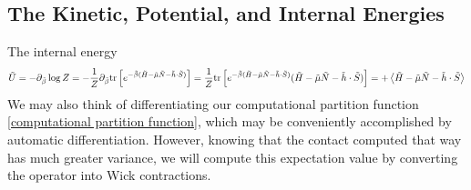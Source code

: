 \subsection{The Kinetic, Potential, and Internal Energies}\label{sec:energy}

The internal energy
\begin{align}
	\tilde{U}
	= - \partial_{\tilde{\beta}} \log Z
	=
	- \frac{1}{Z} \partial_{\tilde{\beta}} \text{tr}\left[ e^{-\tilde{\beta}(\tilde{H}-\tilde{\mu} \tilde{N} - \tilde{h}\cdot \tilde{S})} \right]
	=
	\frac{1}{Z} \text{tr}\left[ e^{-\tilde{\beta}(\tilde{H}-\tilde{\mu} \tilde{N} - \tilde{h}\cdot \tilde{S})} (\tilde{H}-\tilde{\mu} \tilde{N} - \tilde{h}\cdot \tilde{S})\right]
	= + \left\langle \tilde{H} - \tilde{\mu} \tilde{N} - \tilde{h}\cdot \tilde{S} \right\rangle
\end{align}
We may also think of differentiating our computational partition function \eqref{computational partition function}, which may be conveniently accomplished by automatic differentiation.
However, knowing that the contact  computed that way has much greater variance, we will compute this expectation value by converting the operator into Wick contractions.

